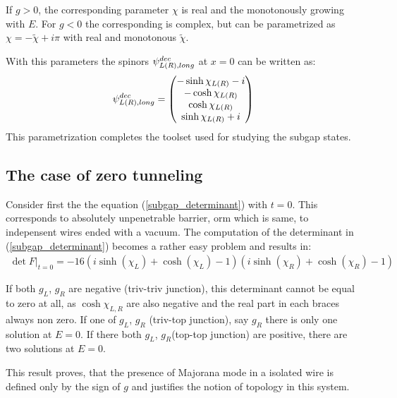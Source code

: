 If $ g>0 $, the corresponding parameter $ \chi $ is real and the monotonously growing with $ E $. For $ g<0 $ the corresponding is complex, but can be parametrized as $ \chi=-\tilde{\chi}+i\pi $ with real and monotonous $\tilde{\chi}  $.

With this parameters the spinors $ \psi_{L\left(R\right),long}^{dec} $ at $ x=0 $ can be written as:
\begin{gather}
\psi_{L\left(R\right),long}^{dec}
=
	\begin{pmatrix}
	-\sinh \chi_{L\left(R\right)} -i
	\\
	-\cosh \chi_{L\left(R\right)}
	\\
	\cosh \chi_{L\left(R\right)}
	\\
	\sinh \chi_{L\left(R\right)} +i
	\end{pmatrix}
\end{gather}
This parametrization completes the toolset used for studying the subgap states.

\subsection{The case of zero tunneling}
Consider first the the equation (\ref{subgap_determinant}) with $ t=0 $. This corresponds to absolutely unpenetrable barrier, orm which is same, to indepensent wires ended with a vacuum. The computation of the determinant in (\ref{subgap_determinant}) becomes a rather easy problem and results in:
\begin{gather}
\label{det_bound_States_zero_t}
	\det F
	\Big|_{t=0}
	=
	-16 \left(i \sinh \left(\chi _L\right)+\cosh \left(\chi _L\right)-1\right) \left(i \sinh \left(\chi _R\right)+\cosh \left(\chi _R\right)-1\right)
\end{gather}

If both $ g_L $, $ g_R $ are negative (triv-triv junction), this determinant cannot be equal to zero at all, as $ \cosh \chi_{L,R} $ are also negative and the real part in each braces always non zero.  If one of $ g_L $, $ g_R $ (triv-top junction), say $ g_R $ there is only one solution at $ E=0 $. If there both $ g_L $, $ g_R $(top-top junction) are positive, there are two solutions at $ E=0 $.

This result proves, that the presence of Majorana mode in a isolated wire is defined only by the sign of $ g $ and justifies the notion of  topology in this system.


